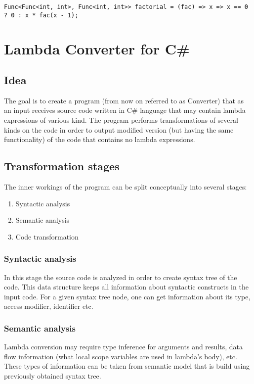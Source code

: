 \documentclass[]{report}
\begin{document}
        \begin{lstlisting}[style=sharpc, caption="factorial defined using lambda"]
        Func<Func<int, int>, Func<int, int>> factorial = (fac) => x => x == 0 ? 0 : x * fac(x - 1); 
        \end{lstlisting}
    
    \chapter{Lambda Converter for C\#}
    \section{Idea}
    The goal is to create a program (from now on referred to as Converter) that as an input receives source code written in C\# language that may contain lambda expressions of various kind. The program performs transformations of several kinds on the code in order to output modified version (but having the same functionality) of the code that contains no lambda expressions.
    \section{Transformation stages}
    The inner workings of the program can be split conceptually into several stages:
    \begin{enumerate}\label{transstages}
    \item       Syntactic analysis
    \item  		Semantic analysis
    \item       Code transformation
    \end{enumerate}
    \subsection{Syntactic analysis}
    In this stage the source code is analyzed in order to create syntax tree of the code. This data structure keeps all information about syntactic constructs in the input code. For a given syntax tree node, one can get information about its type, access modifier, identifier etc. 
    \subsection{Semantic analysis}
    Lambda conversion may require type inference for arguments and results, data flow information (what local scope variables are used in lambda's body), etc. These types of information can be taken from semantic model that is build using previously obtained syntax tree.
    
\end{document}
